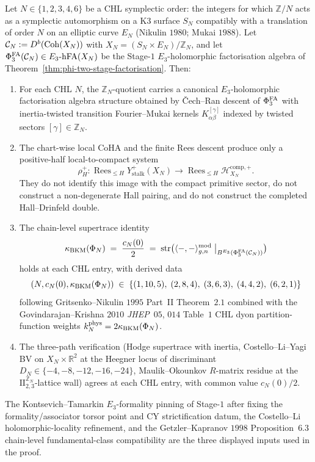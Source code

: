 \begin{theorem}
\label{thm:bl-chl-ladder-deployment}
Let $N \in \{1, 2, 3, 4, 6\}$ be a CHL symplectic order: the integers
for which $\mathbb{Z}/N$ acts as a symplectic automorphism on a K$3$
surface $S_N$ compatibly with a translation of order $N$ on an elliptic
curve $E_N$ (Nikulin $1980$; Mukai $1988$). Let $\mathcal{C}_N :=
D^b(\mathrm{Coh}(X_N))$ with $X_N = (S_N \times E_N) / \mathbb{Z}_N$, and let
$\Phi^{\mathrm{FA}}_{3}(\mathcal{C}_N) \in E_{3}\text{-}\mathrm{hFA}(X_N)$ be the Stage-$1$
$E_3$-holomorphic factorisation algebra of
Theorem~\ref{thm:phi-two-stage-factorisation}. Then:
\begin{enumerate}[label=\textup{(\roman*)}]
 \item For each CHL $N$, the $\mathbb{Z}_N$-quotient carries a canonical
 $E_3$-holomorphic factorisation algebra structure obtained by
 \v{C}ech--Ran descent of $\Phi^{\mathrm{FA}}_{3}$ with inertia-twisted transition
 Fourier--Mukai kernels $K_{\alpha\beta}^{[\gamma]}$ indexed by twisted
 sectors $[\gamma] \in \mathbb{Z}_N$.
 \item The chart-wise local CoHA and the finite Rees descent produce
 only a positive-half local-to-compact system
 \[
  \rho^+_H\colon
  \operatorname{Rees}_{\le H}Y^+_{\mathrm{stalk}}(X_N)
  \longrightarrow
  \operatorname{Rees}_{\le H}\mathcal H_{X_N}^{\mathrm{comp},+}.
 \]
 They do not identify this image with the compact primitive sector, do
 not construct a non-degenerate Hall pairing, and do not construct the
 completed Hall--Drinfeld double.
 \item The chain-level supertrace identity
 \[
 \kappa_{\mathrm{BKM}}(\Phi_N) \;=\; \frac{c_N(0)}{2} \;=\;
 \mathrm{str}\bigl(
 \langle -, - \rangle^{\mathrm{mod}}_{g, n}
 \bigm|_{B^{E_{3}}(\Phi^{\mathrm{FA}}_{3}(\mathcal{C}_N))}
 \bigr)
 \]
 holds at each CHL entry, with derived data
 \[
 (N, c_N(0), \kappa_{\mathrm{BKM}}(\Phi_N)) \;\in\;
 \{(1, 10, 5),\; (2, 8, 4),\; (3, 6, 3),\; (4, 4, 2),\; (6, 2, 1)\}
 \]
 following Gritsenko--Nikulin $1995$ Part~II Theorem~$2.1$
 combined with the Govindarajan--Krishna $2010$ \emph{JHEP}~$05$, $014$
 Table~$1$ CHL dyon partition-function weights
 $k_N^{\mathrm{phys}} = 2 \kappa_{\mathrm{BKM}}(\Phi_N)$.
 \item The three-path verification (Hodge supertrace with inertia,
 Costello--Li--Yagi BV on $X_N \times \mathbb{R}^2$ at the Heegner locus
 of discriminant $D_N \in \{-4, -8, -12, -16, -24\}$, Maulik--Okounkov
 $R$-matrix residue at the $\mathrm{II}_{2, 3}^{\mathbb{Z}_N}$-lattice
 wall) agrees at each CHL entry, with common value $c_N(0)/2$.
\end{enumerate}
The Kontsevich--Tamarkin $E_3$-formality pinning of Stage-$1$ after
fixing the formality/associator torsor point and CY strictification
datum, the Costello--Li holomorphic-locality refinement, and the
Getzler--Kapranov $1998$ Proposition~$6.3$ chain-level
fundamental-class compatibility are the three displayed inputs used in
the proof.
\end{theorem}

